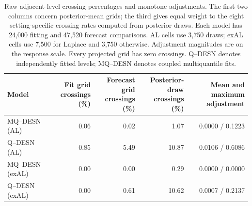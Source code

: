 \begin{table}[!htbp]
\centering
\footnotesize
\setlength{\tabcolsep}{3pt}
\renewcommand{\arraystretch}{1.08}
\begin{tabular}{@{}lrrrr@{}}
\toprule
Model & \shortstack{Fit grid\\crossings (\%)} & \shortstack{Forecast grid\\crossings (\%)} & \shortstack{Posterior-draw\\crossings (\%)} & \shortstack{Mean and maximum\\adjustment} \\
\midrule
MQ--DESN (AL) & 0.06 & 0.02 & 1.07 & 0.0000 / 0.1223 \\
Q--DESN (AL) & 0.85 & 5.49 & 10.87 & 0.0106 / 0.6086 \\
MQ--DESN (exAL) & 0.00 & 0.00 & 0.29 & 0.0000 / 0.0000 \\
Q--DESN (exAL) & 0.00 & 0.61 & 10.62 & 0.0007 / 0.2137 \\
\bottomrule
\end{tabular}
\caption{Raw adjacent-level crossing percentages and monotone adjustments. The first two columns concern posterior-mean grids; the third gives equal weight to the eight setting-specific crossing rates computed from posterior draws. Each model has 24,000 fitting and 47,520 forecast comparisons. AL cells use 3,750 draws; exAL cells use 7,500 for Laplace and 3,750 otherwise. Adjustment magnitudes are on the response scale. Every projected grid has zero crossings. Q--DESN denotes independently fitted levels; MQ--DESN denotes coupled multiquantile fits.}
\label{tab:joint-qdesn-pure-desn-v2-crossings}
\end{table}
